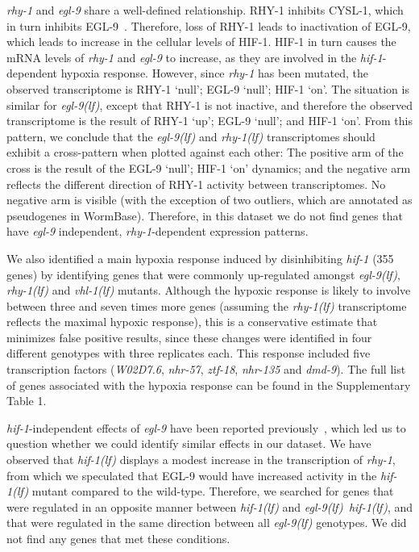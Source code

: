 \documentclass[10pt, onecolumn]{article}
\newcommand{\gene}[1]{\emph{#1}}
\newcommand{\nhr}{\emph{\mbox{nhr-57}}}
\newcommand{\egl}{\emph{\mbox{egl-9}(lf)}}
\newcommand{\rhy}{\emph{\mbox{rhy-1}(lf)}}
\newcommand{\vhl}{\emph{\mbox{vhl-1}(lf)}}
\newcommand{\eglhif}{\emph{\mbox{egl-9(lf)}~\mbox{hif-1(lf)}}}
\newcommand{\hif}{\emph{\mbox{hif-1(lf)}}}
\newcommand{\eglp}{EGL-9}
\newcommand{\rhyp}{RHY-1}
\newcommand{\hifp}{HIF-1}
\newcommand{\cyslp}{CYSL-1}
\begin{document}
\gene{rhy-1} and \gene{egl-9} share a well-defined relationship. \rhyp{}
inhibits \cyslp{},
which in turn inhibits \eglp{}~\cite{Ma2012}. Therefore, loss of \rhyp{} leads
to inactivation of \eglp{}, which leads to increase in the cellular levels of
\hifp{}. \hifp{} in turn causes the mRNA levels of \gene{rhy-1} and \gene{egl-9}
to increase,
as they are involved in the \gene{hif-1}-dependent hypoxia response. However, since
\gene{rhy-1} has been mutated, the observed transcriptome is
\rhyp{} `null'; \eglp{} `null'; \hifp{} `on'. The situation is similar for
\egl{}, except that \rhyp{}
is not inactive, and therefore the observed transcriptome is the result of
\rhyp{} `up'; \eglp{} `null'; and \hifp{} `on'. From this pattern, we conclude that
the \egl{} and \rhy{} transcriptomes should exhibit a cross-pattern when plotted
against each other: The positive
arm of the cross is the result of the \eglp{} `null'; \hifp{} `on' dynamics; and the
negative arm reflects the different direction of \rhyp{} activity between
transcriptomes. No negative arm is visible (with the exception of two
outliers, which are annotated as pseudogenes in WormBase). Therefore, in this
dataset we do not find genes that have \gene{egl-9} independent,
\gene{rhy-1}-dependent expression patterns.

We also identified a main hypoxia response induced by disinhibiting
\gene{hif-1} (355 genes) by identifying genes that were commonly up-regulated
amongst \egl{}, \rhy{} and \vhl{} mutants. Although the hypoxic response is likely
to involve between three and seven times more genes (assuming the \rhy{} transcriptome
reflects the maximal hypoxic response), this is a conservative
estimate that minimizes false positive results, since these changes were
identified in four different genotypes with three replicates each. This response
included five transcription factors (\gene{W02D7.6}, \nhr{}, \gene{ztf-18},
\gene{nhr-135} and \gene{dmd-9}). The full list of genes associated with the
hypoxia response can be found in the Supplementary Table 1.

\gene{hif-1}-independent effects of \gene{egl-9} have been reported
previously~\cite{Park2012}, which led us to question whether we could identify
similar effects in our dataset. We have observed that \hif{} displays a modest
increase in the transcription of \gene{rhy-1}, from which we speculated that
\eglp{} would have increased activity in the \hif{} mutant compared to the wild-type.
Therefore, we searched for genes that were regulated in an opposite manner between
\hif{} and \eglhif{}, and that were regulated in the same direction between
all \egl{} genotypes. We did not find any genes that met these conditions.
\end{document}
